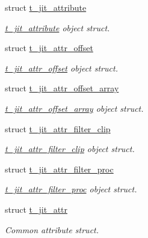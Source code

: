 \begin{DoxyCompactItemize}
\item 
struct \hyperlink{structt__jit__attribute}{t\_\-jit\_\-attribute}
\begin{DoxyCompactList}\small\item\em \hyperlink{structt__jit__attribute}{t\_\-jit\_\-attribute} object struct. \item\end{DoxyCompactList}\item 
struct \hyperlink{structt__jit__attr__offset}{t\_\-jit\_\-attr\_\-offset}
\begin{DoxyCompactList}\small\item\em \hyperlink{structt__jit__attr__offset}{t\_\-jit\_\-attr\_\-offset} object struct. \item\end{DoxyCompactList}\item 
struct \hyperlink{structt__jit__attr__offset__array}{t\_\-jit\_\-attr\_\-offset\_\-array}
\begin{DoxyCompactList}\small\item\em \hyperlink{structt__jit__attr__offset__array}{t\_\-jit\_\-attr\_\-offset\_\-array} object struct. \item\end{DoxyCompactList}\item 
struct \hyperlink{structt__jit__attr__filter__clip}{t\_\-jit\_\-attr\_\-filter\_\-clip}
\begin{DoxyCompactList}\small\item\em \hyperlink{structt__jit__attr__filter__clip}{t\_\-jit\_\-attr\_\-filter\_\-clip} object struct. \item\end{DoxyCompactList}\item 
struct \hyperlink{structt__jit__attr__filter__proc}{t\_\-jit\_\-attr\_\-filter\_\-proc}
\begin{DoxyCompactList}\small\item\em \hyperlink{structt__jit__attr__filter__proc}{t\_\-jit\_\-attr\_\-filter\_\-proc} object struct. \item\end{DoxyCompactList}\item 
struct \hyperlink{structt__jit__attr}{t\_\-jit\_\-attr}
\begin{DoxyCompactList}\small\item\em Common attribute struct. \item\end{DoxyCompactList}\end{DoxyCompactItemize}

